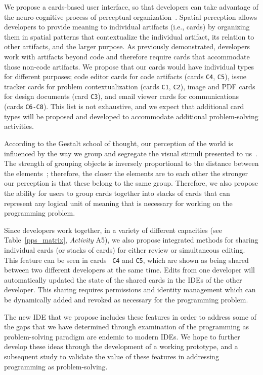 \documentclass{ppig}
\begin{document}
We propose a cards-based user interface, so that developers can take advantage of the neuro-cognitive process of perceptual organization~\cite{kimchi2003perceptual}.
Spatial perception allows developers to provide meaning to individual artifacts (i.e., cards) by organizing them in spatial patterns that contextualize the individual artifact, its relation to other artifacts, and the larger purpose.
As previously demonstrated, developers work with artifacts beyond code and therefore require cards that accommodate those non-code artifacts.
We propose that our cards would have individual types for different purposes; code editor cards for code artifacts (cards \texttt{C4}, \texttt{C5}), issue tracker cards for problem contextualization (cards \texttt{C1}, \texttt{C2}), image and PDF cards for design documents (card \texttt{C3}), and email viewer cards for communications (cards \texttt{C6-C8}).
This list is not exhaustive, and we expect that additional card types will be proposed and developed to accommodate additional problem-solving activities.

According to the Gestalt school of thought, our perception of the world is influenced by the way we group and segregate the visual stimuli presented to us~\cite{kimchi2003perceptual}.
The strength of grouping objects is inversely proportional to the distance between the elements~\cite{bergman2009peirce}; therefore, the closer the elements are to each other the stronger our perception is that these belong to the same group.
Therefore, we also propose the ability for users to group cards together into stacks of cards that can represent any logical unit of meaning that is necessary for working on the programming problem.

Since developers work together, in a variety of different capacities (see Table~\ref{pps_matrix}, \textit{Activity} A5), we also propose integrated methods for sharing individual cards (or stacks of cards) for either review or simultaneous editing.
This feature can be seen in cards ~\texttt{C4} and \texttt{C5}, which are shown as being shared between two different developers at the same time.
Edits from one developer will automatically updated the state of the shared cards in the IDEs of the other developer.
This sharing requires permissions and identity management which can be dynamically added and revoked as necessary for the programming problem.

The new IDE that we propose includes these features in order to address some of the gaps that we have determined through examination of the programming as problem-solving paradigm are endemic to modern IDEs.
We hope to further develop these ideas through the development of a working prototype, and a subsequent study to validate the value of these features in addressing programming as problem-solving.


 
\end{document}

